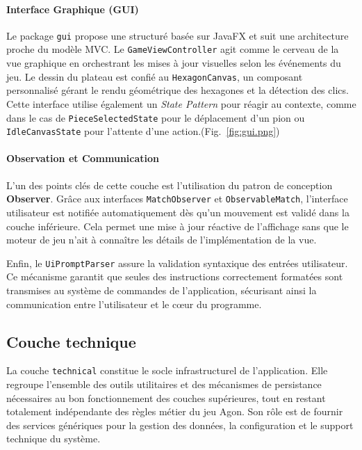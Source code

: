 \documentclass[a4paper]{article}
\begin{document}
\paragraph{Interface Graphique (GUI)}
Le package \texttt{gui} propose une structuré basée sur JavaFX et suit une architecture proche du modèle MVC. Le \texttt{GameViewController} agit comme le cerveau de la vue graphique en orchestrant les mises à jour visuelles selon les événements du jeu. Le dessin du plateau est confié au \texttt{HexagonCanvas}, un composant personnalisé gérant le rendu géométrique des hexagones et la détection des clics. Cette interface utilise également un \textit{State Pattern} pour réagir au contexte, comme dans le cas de \texttt{PieceSelectedState} pour le déplacement d'un pion ou \texttt{IdleCanvasState} pour l'attente d'une action.(Fig.~\ref{fig:gui.png})

\paragraph{Observation et Communication}
L'un des points clés de cette couche est l'utilisation du patron de conception \textbf{Observer}. Grâce aux interfaces \texttt{MatchObserver} et \texttt{ObservableMatch}, l'interface utilisateur est notifiée automatiquement dès qu'un mouvement est validé dans la couche inférieure. Cela permet une mise à jour réactive de l'affichage sans que le moteur de jeu n'ait à connaître les détails de l'implémentation de la vue.

Enfin, le \texttt{UiPromptParser} assure la validation syntaxique des entrées utilisateur. Ce mécanisme garantit que seules des instructions correctement formatées sont transmises au système de commandes de l'application, sécurisant ainsi la communication entre l'utilisateur et le cœur du programme.

\subsection{Couche technique}
La couche \texttt{technical} constitue le socle infrastructurel de l'application. Elle regroupe l'ensemble des outils utilitaires et des mécanismes de persistance nécessaires au bon fonctionnement des couches supérieures, tout en restant totalement indépendante des règles métier du jeu Agon. Son rôle est de fournir des services génériques pour la gestion des données, la configuration et le support technique du système.
\end{document}
